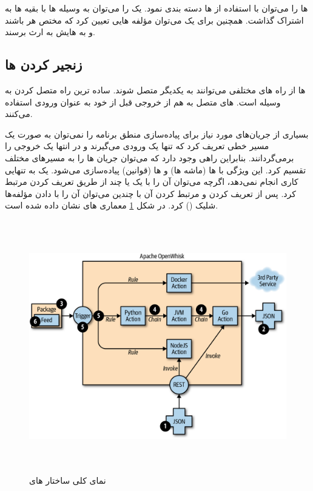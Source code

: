  ها را می‌توان با استفاده از  ها دسته بندی نمود. یک  را می‌توان به وسیله  ها با بقیه  ها به اشتراک گذاشت. همچنین برای یک  می‌توان مؤلفه هایی تعیین کرد که مختص هر  باشند و به  هایش به ارث برسند.

\subsection{زنجیر کردن  ها}

 ها از راه های مختلفی می‌توانند به یکدیگر متصل شوند. ساده ترین راه متصل کردن به وسیله  است.  های متصل به هم از خروجی  قبل از خود به عنوان ورودی استفاده می‌کنند.

بسیاری از جریان‌های مورد نیاز برای پیاده‌سازی منطق برنامه را نمی‌توان به صورت یک مسیر خطی تعریف کرد که تنها یک ورودی می‌گیرند و در انتها یک خروجی را برمی‌گردانند. بنابراین راهی وجود دارد که می‌توان جریان  ها را به مسیرهای مختلف تقسیم کرد. این ویژگی با  ها (ماشه ها) و  ها (قوانین) پیاده‌سازی می‌شود. یک  به تنهایی کاری انجام نمی‌دهد، اگرچه می‌توان آن را با یک یا چند  از طریق تعریف کردن  مرتبط کرد. پس از تعریف کردن  و مرتبط کردن آن با چندین  می‌توان آن را با دادن مؤلفه‌ها شلیک () کرد. در شکل \ref{OpenWhisk_actions_architecture} معماری  های  نشان داده شده است.
\newline
\newline

\begin{figure}[!h]
	\centering
	\includegraphics[height=11cm]{images/OpenWhisk_actions_architecture}
	\caption{نمای کلی ساختار  های }
	\label{OpenWhisk_actions_architecture}
\end{figure}

